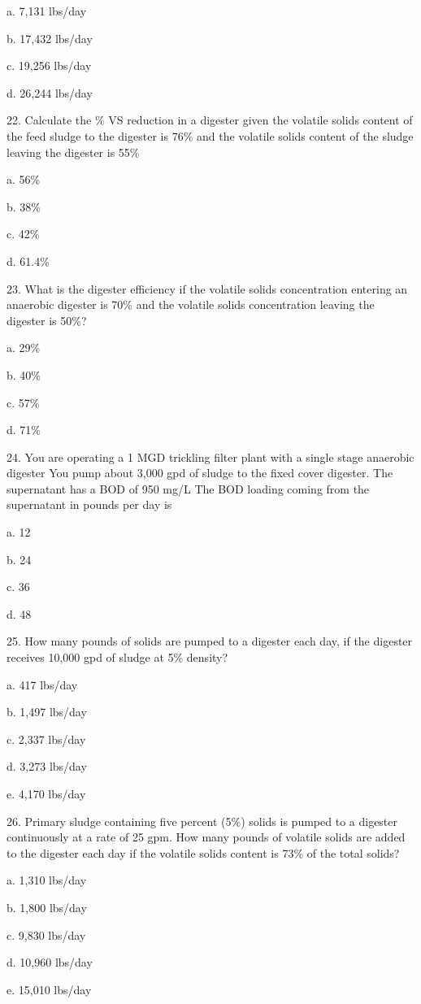 \documentclass{article}
\begin{document}
a. 7,131 lbs/day 

b. 17,432 lbs/day 

c. 19,256 lbs/day 

d. 26,244 lbs/day 


22. Calculate the \% VS reduction in a digester given the volatile solids content of the feed sludge to the digester is 76\% and the volatile solids content of the sludge leaving the digester is 55\% 

a. 56\% 

b. 38\% 

c. 42\% 

d. 61.4\% 


23. What is the digester efficiency if the volatile solids concentration entering an anaerobic digester is 70\% and the volatile solids concentration leaving the digester is 50\%? 

a. 29\% 

b. 40\% 

c. 57\% 

d. 71\% 


24. You are operating a 1 MGD trickling filter plant with a single stage anaerobic digester You pump about 3,000 gpd of sludge to the fixed cover digester. The supernatant has a BOD of 950 mg/L The BOD loading coming from the supernatant in pounds per day is 

a. 12 

b. 24 

c. 36 

d. 48 


25. How many pounds of solids are pumped to a digester each day, if the digester receives 10,000 gpd of sludge at 5\% density? 

a. 417 lbs/day 

b. 1,497 lbs/day 

c. 2,337 lbs/day 

d. 3,273 lbs/day 

e. 4,170 lbs/day 


26. Primary sludge containing five percent (5\%) solids is pumped to a digester continuously at a rate of 25 gpm. How many pounds of volatile solids are added to the digester each day if the volatile solids content is 73\% of the total solids? 

a. 1,310 lbs/day 

b. 1,800 lbs/day 

c. 9,830 lbs/day 

d. 10,960 lbs/day 

e. 15,010 lbs/day 
\end{document}
